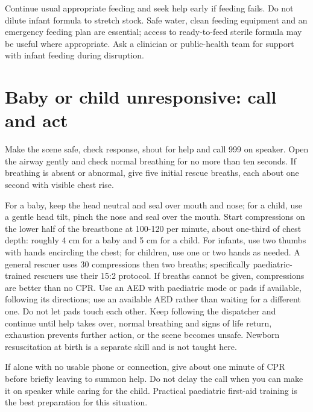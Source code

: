 \documentclass[10pt,openright]{book}
\begin{document}
Continue usual appropriate feeding and seek help early if feeding fails. Do not dilute infant formula to stretch stock. Safe water, clean feeding equipment and an emergency feeding plan are essential; access to ready-to-feed sterile formula may be useful where appropriate. Ask a clinician or public-health team for support with infant feeding during disruption.

\section*{Baby or child unresponsive: call and act}
Make the scene safe, check response, shout for help and call 999 on speaker. Open the airway gently and check normal breathing for no more than ten seconds. If breathing is absent or abnormal, give five initial rescue breaths, each about one second with visible chest rise.

For a baby, keep the head neutral and seal over mouth and nose; for a child, use a gentle head tilt, pinch the nose and seal over the mouth. Start compressions on the lower half of the breastbone at 100-120 per minute, about one-third of chest depth: roughly 4 cm for a baby and 5 cm for a child. For infants, use two thumbs with hands encircling the chest; for children, use one or two hands as needed. A general rescuer uses 30 compressions then two breaths; specifically paediatric-trained rescuers use their 15:2 protocol. If breaths cannot be given, compressions are better than no CPR. Use an AED with paediatric mode or pads if available, following its directions; use an available AED rather than waiting for a different one. Do not let pads touch each other. Keep following the dispatcher and continue until help takes over, normal breathing and signs of life return, exhaustion prevents further action, or the scene becomes unsafe. Newborn resuscitation at birth is a separate skill and is not taught here.

If alone with no usable phone or connection, give about one minute of CPR before briefly leaving to summon help. Do not delay the call when you can make it on speaker while caring for the child. Practical paediatric first-aid training is the best preparation for this situation.
\end{document}
